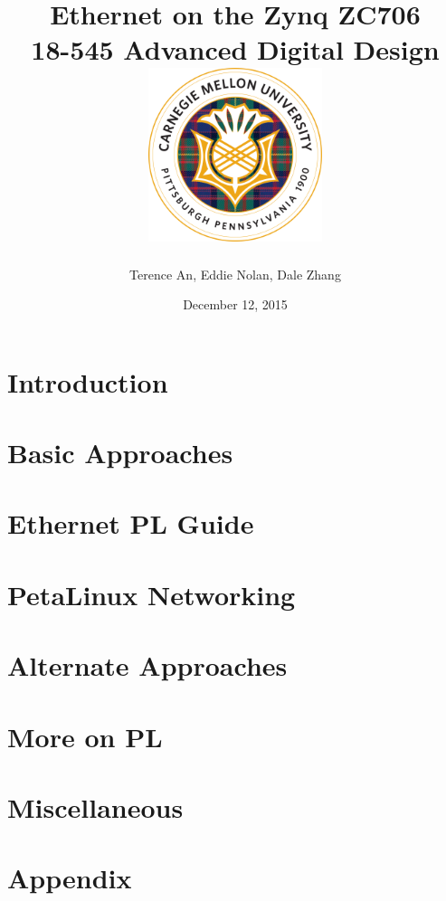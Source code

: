 \documentclass[12pt]{report}
\title{
  {Ethernet on the Zynq ZC706 \vspace{0.2in}}\\
  {\large 18-545 Advanced Digital Design \vspace{0.2in}}\\
  {\includegraphics[width=2in]{cmu_seal.png}}
}
\author{Terence An, Eddie Nolan, Dale Zhang}
\date{December 12, 2015}
\begin{document}
\maketitle

\chapter{Introduction}

\chapter{Basic Approaches}

\chapter{Ethernet PL Guide}

\chapter{PetaLinux Networking}

\chapter{Alternate Approaches}

\chapter{More on PL}

\chapter{Miscellaneous}

\appendix
\chapter{Appendix}
\end{document}
